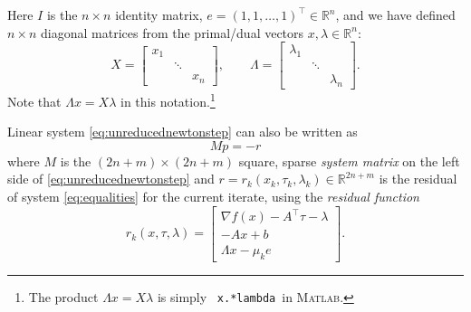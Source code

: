 \documentclass[11pt]{article}
\newcommand{\RR}{\mathbb{R}}
\newcommand{\grad}{\nabla}
\newcommand{\Matlab}{\textsc{Matlab}\xspace}
\begin{document}
Here $I$ is the $n\times n$ identity matrix, $e=(1,1,\dots,1)^\top \in \RR^n$, and we have defined $n\times n$ diagonal matrices from the primal/dual vectors $x,\lambda\in\RR^n$:
    $$X = \begin{bmatrix} x_1 & & \\ & \ddots & \\ & & x_n \end{bmatrix}, \qquad \Lambda = \begin{bmatrix} \lambda_1 & & \\ & \ddots & \\ & & \lambda_n \end{bmatrix}.$$
Note that $\Lambda x = X \lambda$ in this notation.\footnote{The product $\Lambda x = X\lambda$ is simply \, \texttt{x.*lambda}\, in \Matlab.}

Linear system \eqref{eq:unreducednewtonstep} can also be written as
\begin{equation}
M p = - r \label{eq:overallnewtonstep}
\end{equation}
where $M$ is the $(2n+m) \times (2n+m)$ square, sparse \emph{system matrix} on the left side of \eqref{eq:unreducednewtonstep} and $r=r_k(x_k,\tau_k,\lambda_k) \in \RR^{2n+m}$ is the residual of system \eqref{eq:equalities} for the current iterate, using the \emph{residual function}
\begin{equation}
r_k(x,\tau,\lambda) = \begin{bmatrix}
\grad f(x) - A^\top \tau - \lambda \\
- A x + b \\
\Lambda x - \mu_k e
\end{bmatrix}. \label{eq:residualnewtonstep}
\end{equation}
\end{document}
